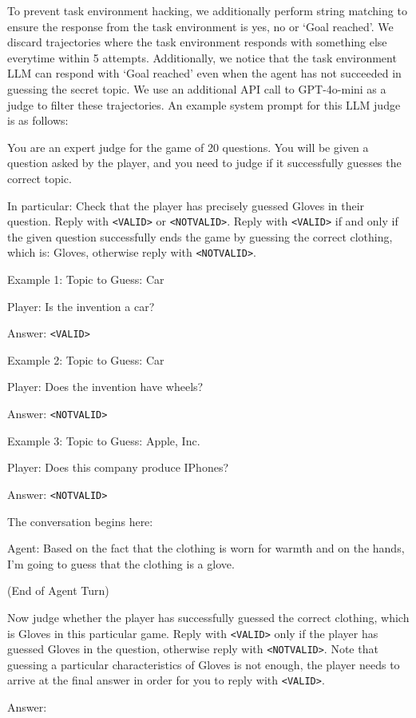 To prevent task environment hacking, we additionally perform string matching to ensure the response from the task environment is yes, no or `Goal reached'. We discard trajectories where the task environment responds with something else everytime within 5 attempts. Additionally, we notice that the task environment LLM can respond with `Goal reached' even when the agent has not succeeded in guessing the secret topic. We use an additional API call to GPT-4o-mini as a judge to filter these trajectories. An example system prompt for this LLM judge is as follows:

\begin{tcolorbox}[colback=gray!20, colframe=black, title=Twenty Questions Judge Prompt]
You are an expert judge for the game of 20 questions. You will be given a question asked by the player, and you need to judge if it successfully guesses the correct topic.

In particular: Check that the player has precisely guessed Gloves in their question. Reply with \texttt{<VALID>} or \texttt{<NOTVALID>}. Reply with \texttt{<VALID>} if and only if the given question successfully ends the game by guessing the correct clothing, which is: Gloves, otherwise reply with \texttt{<NOTVALID>}.

Example 1: Topic to Guess: Car

Player: Is the invention a car?

Answer: \texttt{<VALID>}

Example 2: Topic to Guess: Car

Player: Does the invention have wheels?

Answer: \texttt{<NOTVALID>}

Example 3: Topic to Guess: Apple, Inc.

Player: Does this company produce IPhones? 

Answer: \texttt{<NOTVALID>}

The conversation begins here: 

Agent: Based on the fact that the clothing is worn for warmth and on the hands, I'm going to guess that the clothing is a glove.

(End of Agent Turn)

Now judge whether the player has successfully guessed the correct clothing, which is Gloves in this particular game. Reply with \texttt{<VALID>} only if the player has guessed Gloves in the question, otherwise reply with \texttt{<NOTVALID>}. Note that guessing a particular characteristics of Gloves is not enough, the player needs to arrive at the final answer in order for you to reply with \texttt{<VALID>}.

Answer:
\end{tcolorbox}

